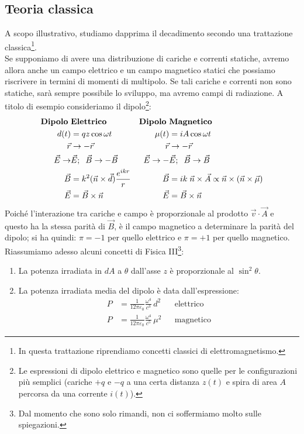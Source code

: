 \subsection{Teoria classica} A scopo illustrativo, studiamo dapprima il decadimento secondo una trattazione classica\footnote{In questa trattazione riprendiamo concetti classici di elettromagnetismo.}.\\
Se supponiamo di avere una distribuzione di cariche e correnti statiche, avremo allora anche un campo elettrico e un campo magnetico statici che possiamo riscrivere in termini di momenti di multipolo. Se tali cariche e correnti non sono statiche, sarà sempre possibile lo sviluppo, ma avremo campi di radiazione. A titolo di esempio consideriamo il dipolo\footnote{Le espressioni di dipolo elettrico e magnetico sono quelle per le configurazioni più semplici (cariche $+q$ e $-q$ a una certa distanza $z(t)$ e spira di area $A$ percorsa da una corrente $i(t)$).}:
\begin{displaymath}
\begin{aligned}
\text{\textbf{Dipolo} }&\text{\textbf{Elettrico}}\index{dipolo!elettrico} & \text{\textbf{Dipolo} }&\text{\textbf{Magnetico}}\index{dipolo!magnetico} \\
d(t) &= qz \cos{\omega t} & \mu(t)&= i A \cos{\omega t} \\
\vec{r}&\to-\vec{r} & \vec{r}&\to-\vec{r} \\
 \vec{E}\to&\vec{E};\;\; \vec{B}\to-\vec{B}\quad & \vec{E}\to-&\vec{E}; \;\; \vec{B}\to\vec{B} \\
\vec{B} &= k^2 (\vec{n}\times \vec{d}) \frac{e^{ikr}}{r} & \vec{B}&= ik\; \vec{n}\times \vec{A} \propto \vec{n} \times (\vec{n}\times \vec{\mu}) \\
\vec{E} &= \vec{B}\times \vec{n} & \vec{E} &= \vec{B}\times \vec{n} 
\end{aligned}
\end{displaymath}
Poiché l'interazione tra cariche e campo è proporzionale al prodotto $\vec{v}\cdot\vec{A}$ e questo ha la stessa parità di $\vec{B}$, è il campo magnetico a determinare la parità del dipolo; si ha quindi: $\pi=-1$ per quello elettrico e $\pi=+1$ per quello magnetico.\\
Riassumiamo adesso alcuni concetti di Fisica III\footnote{Dal momento che sono solo rimandi, non ci soffermiamo molto sulle spiegazioni.}:
\begin{enumerate}
    \item La potenza irradiata in $dA$ a $\theta$ dall'asse $z$ è proporzionale al $\sin^2{\theta}$.
    \item La potenza irradiata media del dipolo è data dall'espressione:
    \begin{displaymath}
    \begin{aligned}
    P&= \frac{1}{12\pi\varepsilon_0} \frac{\omega^4}{c^3} \, d^2 & &\text{elettrico} \\
    P&= \frac{1}{12\pi\varepsilon_0} \frac{\omega^4}{c^5} \, \mu^2 & &\text{magnetico} 
    \end{aligned}
    \end{displaymath}
\end{enumerate}
